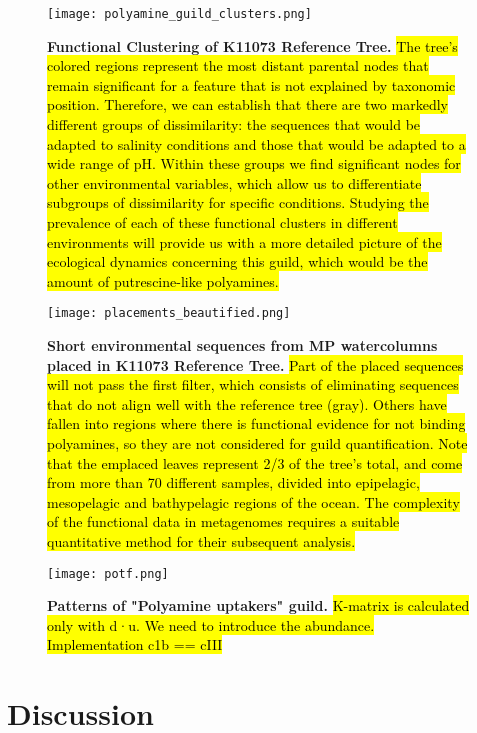 \documentclass[Journal,letterpaper,NoLists]{ascelike-new}
\begin{document}
\begin{figure}[]
\centering
\texttt{[image: polyamine\_guild\_clusters.png]}
\caption{ {\bf Functional Clustering of K11073 Reference Tree.} \hl{The tree's colored regions represent the most distant parental nodes that remain significant for a feature that is not explained by taxonomic position. Therefore, we can establish that there are two markedly different groups of dissimilarity: the sequences that would be adapted to salinity conditions and those that would be adapted to a wide range of pH. Within these groups we find significant nodes for other environmental variables, which allow us to differentiate subgroups of dissimilarity for specific conditions. Studying the prevalence of each of these functional clusters in different environments will provide us with a more detailed picture of the ecological dynamics concerning this guild, which would be the amount of putrescine-like polyamines.}}
\label{fig:Fig2}
\end{figure}

\begin{figure}[]
\centering
\texttt{[image: placements\_beautified.png]}
\caption{ {\bf Short environmental sequences from MP watercolumns placed in K11073 Reference Tree.} \hl{Part of the placed sequences will not pass the first filter, which consists of eliminating sequences that do not align well with the reference tree (gray). Others have fallen into regions where there is functional evidence for not binding polyamines, so they are not considered for guild quantification. Note that the emplaced leaves represent 2/3 of the tree's total, and come from more than 70 different samples, divided into epipelagic, mesopelagic and bathypelagic regions of the ocean. The complexity of the functional data in metagenomes requires a suitable quantitative method for their subsequent analysis. }}
\label{fig:Fig3}
\end{figure}


\begin{figure}[]
\centering
\texttt{[image: potf.png]}
\caption{ {\bf Patterns of "Polyamine uptakers" guild.} \hl{K-matrix is calculated only with d·u. We need to introduce the abundance. Implementation c1b == cIII}}
\label{fig:Fig4}
\end{figure}

\section{Discussion}
\end{document}
